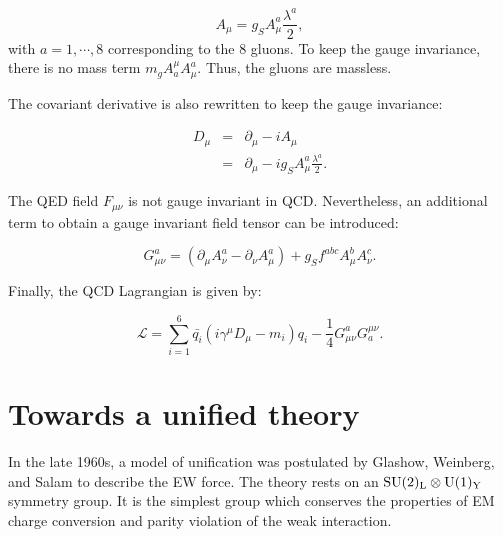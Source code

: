     \begin{equation}
      A_{\mu} = g_S A^a_{\mu}\frac{\lambda^a}{2},
    \end{equation}
    with $a = 1,\cdots,8$ corresponding to the 8 gluons.
    To keep the gauge invariance, there is no mass term $m_g A^{\mu}_a A^a_{\mu}$.
    Thus, the gluons are massless. 

    The covariant derivative is also rewritten to keep the gauge invariance:

    \begin{equation}
      \begin{array}{rcl}
        D_{\mu} & = & \partial_{\mu} - i A_{\mu} \\
                & = & \partial_{\mu} - i g_S A^a_{\mu} \frac{\lambda^a}{2}.
      \end{array}
    \end{equation}

    The \gls{QED} field $F_{\mu \nu}$ is not gauge invariant in \gls{QCD}.
    Nevertheless, an additional term to obtain a gauge invariant field tensor can be introduced:
    
    \begin{equation}
      G^a_{\mu \nu} = \left( \partial_{\mu} A^a_{\nu} - \partial_{\nu} A^a_{\mu} \right) + g_S f^{abc} A^b_{\mu} A^c_{\nu}.
    \end{equation} 

    Finally, the \gls{QCD} Lagrangian is given by:

    \begin{equation}
      \mathcal{L} = \sum_{i=1}^6  \bar{q_i} \left(i \gamma^{\mu}D_{\mu} -m_i \right)q_i - \frac{1}{4} G_{\mu \nu}^{a} G_{a}^{\mu \nu}.
    \end{equation}
    
    \section{Towards a unified theory}

    In the late 1960s, a model of unification was postulated by Glashow, Weinberg, and Salam to describe the \acrfull{EW} force.
    The theory rests on an  $\rm{SU}(2)_{\rm{L}} \otimes \rm{U}(1)_{\rm{Y}}$ symmetry group.
    It is the simplest group which conserves the properties of EM charge conversion and parity violation of the weak interaction.

